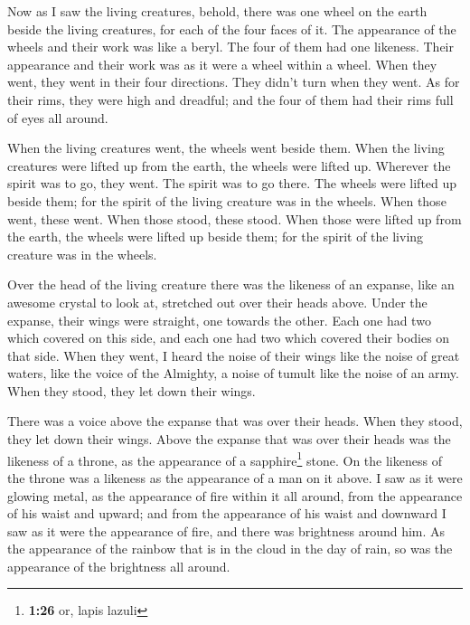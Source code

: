  Now as I saw the living creatures, behold, there was one
wheel on the earth beside the living creatures, for each of the four
faces of it.  The appearance of the wheels and their work
was like a beryl. The four of them had one likeness. Their appearance
and their work was as it were a wheel within a wheel. 
When they went, they went in their four directions. They didn't turn
when they went.  As for their rims, they were high and
dreadful; and the four of them had their rims full of eyes all around.

 When the living creatures went, the wheels went beside
them. When the living creatures were lifted up from the earth, the
wheels were lifted up.  Wherever the spirit was to go,
they went. The spirit was to go there. The wheels were lifted up beside
them; for the spirit of the living creature was in the wheels.
 When those went, these went. When those stood, these
stood. When those were lifted up from the earth, the wheels were lifted
up beside them; for the spirit of the living creature was in the wheels.

 Over the head of the living creature there was the
likeness of an expanse, like an awesome crystal to look at, stretched
out over their heads above.  Under the expanse, their
wings were straight, one towards the other. Each one had two which
covered on this side, and each one had two which covered their bodies on
that side.  When they went, I heard the noise of their
wings like the noise of great waters, like the voice of the Almighty, a
noise of tumult like the noise of an army. When they stood, they let
down their wings.

 There was a voice above the expanse that was over their
heads. When they stood, they let down their wings.  Above
the expanse that was over their heads was the likeness of a throne, as
the appearance of a sapphire\footnote{\textbf{1:26} or, lapis lazuli}
stone. On the likeness of the throne was a likeness as the appearance of
a man on it above.  I saw as it were glowing metal, as
the appearance of fire within it all around, from the appearance of his
waist and upward; and from the appearance of his waist and downward I
saw as it were the appearance of fire, and there was brightness around
him.  As the appearance of the rainbow that is in the
cloud in the day of rain, so was the appearance of the brightness all
around.

